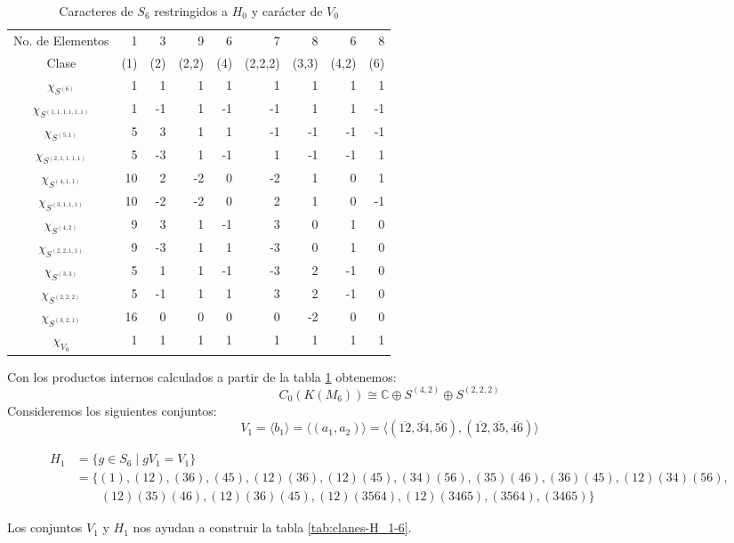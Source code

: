 \documentclass[12pt]{book}
\theoremstyle{definition}
\newcounter{in}
\begin{document}
  
  \begin{table}[!hbtp]
    \centering
    \begin{tabular}{c |r r r r r r r r}
      No. de Elementos  & 1 & 3 & 9 & 6 & 7 & 8 & 6 & 8  \\
      Clase&(1)& (2) & (2,2) & (4) & (2,2,2)& (3,3) & (4,2) & (6)\\
      \hline
      $\chi_{S^{{(6)}}}$         & 1 & 1  & 1 & 1 & 1 & 1 & 1 & 1\\
      $\chi_{S^{{(1,1,1,1,1,1)}}}$ & 1 & -1 & 1 & -1&-1 & 1 & 1 &-1\\
      $\chi_{S^{{(5,1)}}}$       & 5 & 3  & 1 & 1 &-1 &-1 &-1 &-1\\
      $\chi_{S^{{(2,1,1,1,1)}}}$  & 5 & -3 & 1 &-1 & 1 &-1  &-1 & 1\\
      $\chi_{S^{{(4,1,1)}}}$     & 10& 2  & -2& 0 &-2 & 1  & 0 & 1\\
      $\chi_{S^{{(3,1,1,1)}}}$    & 10&-2  &-2 & 0 & 2 & 1 & 0 &-1\\
      $\chi_{S^{{(4,2)}}}$       & 9 & 3  & 1 & -1& 3 & 0 & 1 & 0\\
      $\chi_{S^{{(2,2,1,1)}}}$    & 9 & -3 & 1 & 1 &-3 & 0 & 1 & 0\\
      $\chi_{S^{{(3,3)}}}$       & 5 & 1  & 1 &-1 & -3& 2 & -1& 0\\
      $\chi_{S^{{(2,2,2)}}}$     & 5  & -1 & 1 & 1 & 3 & 2 &-1& 0\\
      $\chi_{S^{{(3,2,1)}}}$     & 16 & 0  & 0 & 0 & 0 &-2 & 0& 0\\
      \hline
      $\chi_{V_{0}}$        & 1 & 1 & 1 & 1 & 1 & 1 &1 & 1  \\
    \end{tabular}

    \caption{Caracteres de $S_{6}$ restringidos a $H_{0}$ y carácter de $V_{0}$}
    \label{tab:clanes-H_0-6}
  \end{table}
  Con los productos internos calculados a partir de la tabla
  \ref{tab:clanes-H_0-6} obtenemos:
  \begin{equation}
    C_{0}(K(M_{6}))\cong \mathbb{C}\oplus S^{(4,2)}\oplus S^{(2,2,2)}
    \label{C0-KM6}
  \end{equation}
Consideremos los siguientes conjuntos:
  $$V_{1}=\langle b_{1}\rangle=\langle (a_{1},a_{2})\rangle=\langle(\overline{12},\overline{34},\overline{56}),(\overline{12},\overline{35},\overline{46})\rangle$$
  \begin{footnotesize}
    \begin{align*}
      H_{1}&=\{g\in S_{6}\mid gV_{1}=V_{1}\}\\
      &=\{(1),(12),(36),(45),(12)(36),(12)(45),(34)(56),(35)(46),(36)(45),(12)(34)(56),\\
      &\qquad{}(12)(35)(46),(12)(36)(45),(12)(3564),(12)(3465),(3564),(3465)\}
    \end{align*}
  \end{footnotesize}
  Los conjuntos $V_{1}$ y $H_{1}$ nos ayudan a construir la tabla \ref{tab:clanes-H_1-6}.
  
\end{document}
